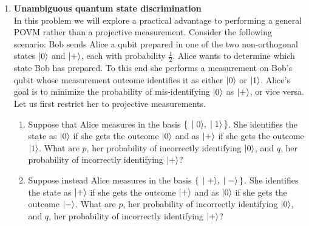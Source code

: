 \documentclass[12pt]{article}
\begin{document}
\begin{enumerate}
\item {\bf Unambiguous quantum state discrimination}\\
In this problem we will explore a practical advantage to performing a general POVM rather than a projective measurement. Consider the following scenario: Bob sends Alice a qubit prepared in one of the two non-orthogonal states $\ket{0}$ and $\ket{+}$, each with probability $\frac{1}{2}$. Alice wants to determine which state Bob has prepared. To this end she performs a measurement on Bob's qubit whose measurement outcome identifies it as either $\ket{0}$ or $\ket{1}$. Alice's goal is to minimize the probability of mis-identifying $\ket{0}$ as $\ket{+}$, or vice versa. Let us first restrict her to projective measurements.
\begin{enumerate}
\item Suppose that Alice measures in the basis $\set{\ket{0},\ket{1}}$. She identifies the state as $\ket{0}$ if she gets the outcome $\ket{0}$ and as $\ket{+}$ if she gets the outcome $\ket{1}$. What are $p$, her probability of incorrectly identifying $\ket{0}$, and $q$, her probability of incorrectly identifying $\ket{+}$?
\item Suppose instead Alice measures in the basis $\set{\ket{+},\ket{-}}$. She identifies the state as $\ket{+}$ if she gets the outcome $\ket{+}$ and as $\ket{0}$ if she gets the outcome $\ket{-}$. What are $p$, her probability of incorrectly identifying $\ket{0}$, and $q$, her probability of incorrectly identifying $\ket{+}$?

\end{enumerate}
\end{enumerate}
\end{document}
